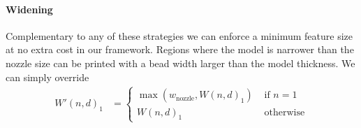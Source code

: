 \paragraph{Widening}
Complementary to any of these strategies we can enforce a minimum feature size at no extra cost in our framework.
Regions where the model is narrower than the nozzle size can be printed with a bead width larger than the model thickness.
We can simply override
\begin{align*}
W'(n,d)_1 &=
\begin{cases}
\max \left( w_\text{nozzle}  ,  W(n,d)_1 \right) & \text{ if } n = 1 \\
W(n,d)_1 & \text{ otherwise}
\end{cases}
\end{align*}




















